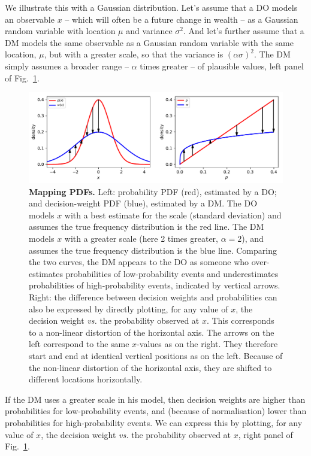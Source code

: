 \documentclass[a4paper, 12pt]{article}
\newcommand{\flabel}[1]{\label{fig:#1}}
\newcommand{\fref}[1]{Fig.~\ref{fig:#1}}
\newcommand{\vs}{\textit{vs.}\xspace}
\begin{document}
We illustrate this with a Gaussian distribution.
Let's assume that a DO models an observable $x$ -- which will often be a future change in wealth -- as a Gaussian random variable with location $\mu$ and variance $\sigma^2$. And let's further assume that a DM models the same observable as a Gaussian random variable with the same location, $\mu$, but with a greater scale, so that the variance is $(\alpha\sigma)^2$. The DM simply assumes a broader range -- $\alpha$ times greater -- of plausible values, left panel of \fref{mapping_pdfs}.
\begin{figure}[!htb]
\centering
\includegraphics[width=\textwidth]{./figs/mapping_pdfs.pdf}
\caption{\textbf{Mapping PDFs.} Left: probability PDF (red), estimated by a DO; and decision-weight PDF (blue), estimated by a DM. The DO models $x$ with a best estimate for the scale (standard deviation) and assumes the true frequency distribution is the red line. The DM models $x$ with a greater scale (here 2 times greater, $\alpha=2$), and assumes the true frequency distribution is the blue line. Comparing the two curves, the DM appears to the DO as someone who over-estimates probabilities of low-probability events and underestimates probabilities of high-probability events, indicated by vertical arrows.
Right: the difference between decision weights and probabilities can also be expressed by directly plotting, for any value of $x$, the decision weight \vs the probability observed at $x$. This corresponds to a non-linear distortion of the horizontal axis. The arrows on the left correspond to the same $x$-values as on the right. They therefore start and end at identical vertical positions as on the left. Because of the non-linear distortion of the horizontal axis, they are shifted to different locations horizontally.}
\flabel{mapping_pdfs}
\end{figure}

If the DM uses a greater scale in his model, then decision weights are higher than probabilities for low-probability events, and (because of normalisation) lower than probabilities for high-probability events. We can express this by plotting, for any value of $x$, the decision weight \vs the probability observed at $x$, right panel of \fref{mapping_pdfs}.
\end{document}

